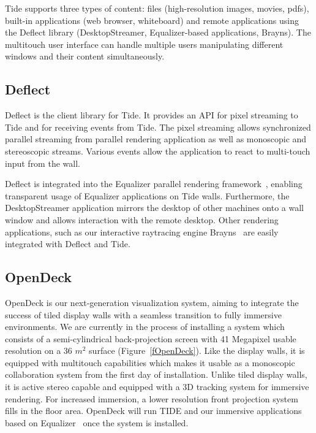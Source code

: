\documentclass[10pt]{llncs}
\newcommand{\fig}[1]{Figure~\ref{#1}}
\begin{document}
Tide supports three types of content: files (high-resolution images, movies,
pdfs), built-in applications (web browser, whiteboard) and remote applications
using the Deflect library (DesktopStreamer, Equalizer-based applications,
Brayns). The multitouch user interface can handle multiple users manipulating
different windows and their content simultaneously.

\subsection{Deflect}

Deflect is the client library for Tide. It provides an API for pixel streaming
to Tide and for receiving events from Tide. The pixel streaming allows
synchronized parallel streaming from parallel rendering application as well as
monoscopic and stereoscopic streams. Various events allow the application to
react to multi-touch input from the wall.

Deflect is integrated into the Equalizer parallel rendering
framework~\cite{EMP:09}, enabling transparent usage of Equalizer applications on
Tide walls. Furthermore, the DesktopStreamer application mirrors the desktop of
other machines onto a wall window and allows interaction with the remote
desktop. Other rendering applications, such as our interactive raytracing
engine Brayns~\cite{brayns} are easily integrated with Deflect and Tide.

\subsection{OpenDeck}

OpenDeck is our next-generation visualization system, aiming to integrate the
success of tiled display walls with a seamless transition to fully immersive
environments. We are currently in the process of installing a system which
consists of a semi-cylindrical back-projection screen with 41 Megapixel usable
resolution on a 36 $m^2$ surface (\fig{fOpenDeck}). Like the display walls, it
is equipped with multitouch capabilities which makes it usable as a monoscopic
collaboration system from the first day of installation. Unlike tiled display
walls, it is active stereo capable and equipped with a 3D tracking system for
immersive rendering. For increased immersion, a lower resolution front
projection system fills in the floor area. OpenDeck will run TIDE and our
immersive applications based on Equalizer~\cite{EMP:09} once the system is
installed.
\end{document}
